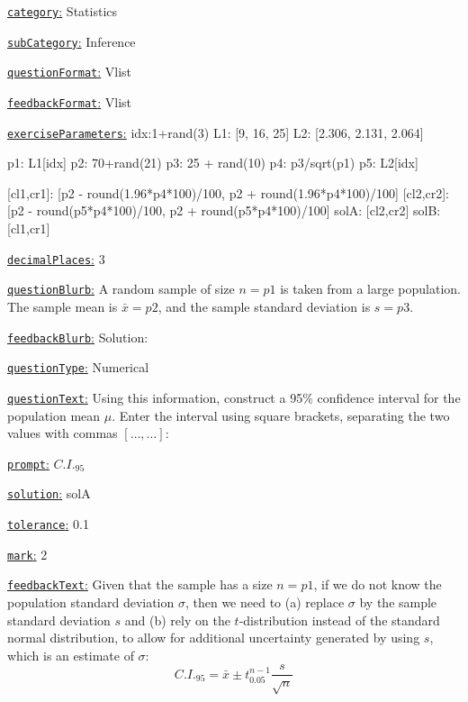 \documentclass[preview]{standalone}
\newcommand \fieldname[1]{\underline{\texttt{#1}:}}
\begin{document}
\fieldname{category}  %
Statistics

\fieldname{subCategory} %
Inference

\fieldname{questionFormat}
Vlist

\fieldname{feedbackFormat}
Vlist

\fieldname{exerciseParameters}
idx:1+rand(3)
L1: [9, 16, 25]
L2: [2.306, 2.131, 2.064]

p1: L1[idx]
p2: 70+rand(21)
p3: 25 + rand(10)
p4: p3/sqrt(p1)
p5: L2[idx]

[cl1,cr1]: [p2 - round(1.96*p4*100)/100, p2 + round(1.96*p4*100)/100]
[cl2,cr2]: [p2 - round(p5*p4*100)/100, p2 + round(p5*p4*100)/100]
solA: [cl2,cr2]
solB: [cl1,cr1]

\fieldname{decimalPlaces}
3

\fieldname{questionBlurb}
A random sample of size $n={p1}$ is taken from a large population. The sample mean is $\bar x = {p2}$, and the sample standard deviation is $s = {p3}$.

\fieldname{feedbackBlurb}
Solution:

\fieldname{questionType}
Numerical

\fieldname{questionText}
Using this information, construct a 95\% confidence interval for the population mean $\mu$. Enter the interval using square brackets, separating the two values with commas $\left[\dots ,\dots \right]$:

\fieldname{prompt}
$C.I._{95}$

\fieldname{solution}
solA

\fieldname{tolerance}
0.1

\fieldname{mark}
2

\fieldname{feedbackText}
Given that the sample has a size $n={p1}$, if we do not know the population standard deviation $\sigma$, then we need to (a) replace $\sigma$ by the sample standard deviation $s$ and (b) rely on the $t$-distribution instead of the standard normal distribution, to allow for additional uncertainty generated by using $s$, which is an estimate of $\sigma$:
\[
C.I._{95} = \bar x \pm t_{0.05}^{n-1} \frac{s}{\sqrt{n}}
\]
\end{document}
